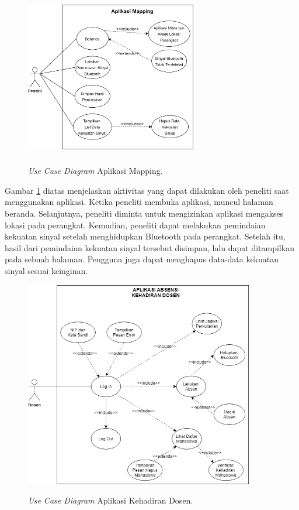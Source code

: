 \begin{figure}[H]
	\center
	\shadowbox
	{\includegraphics [width=7.5cm, height=7cm]{gambar/model/use-case-mapping}}
	\caption{\textit{Use Case Diagram} Aplikasi Mapping.}
	\label{usecasemapping}
\end{figure}

\par Gambar \ref{usecasemapping} diatas menjelaskan aktivitas yang dapat dilakukan oleh peneliti saat menggunakan aplikasi. Ketika peneliti membuka aplikasi, muncul halaman beranda. Selanjutnya, peneliti diminta untuk mengizinkan aplikasi mengakses lokasi pada perangkat. Kemudian, peneliti dapat melakukan pemindaian kekuatan sinyal setelah menghidupkan Bluetooth pada perangkat. Setelah itu, hasil dari pemindaian kekuatan sinyal tersebut disimpan, lalu dapat ditampilkan pada sebuah halaman. Pengguna juga dapat menghapus data-data kekuatan sinyal sesuai keinginan.
\fancyhf{}
\fancyfoot[R]{\thepage}

\begin{figure}[H]
	\center
	\shadowbox
	{\includegraphics [width=10cm, height=9cm]{gambar/model/use-case-dosen}}
	\caption{\textit{Use Case Diagram} Aplikasi Kehadiran Dosen.}
	\label{usecasedosen}
\end{figure}

